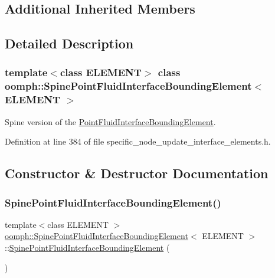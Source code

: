 \subsection*{Additional Inherited Members}


\subsection{Detailed Description}
\subsubsection*{template$<$class E\+L\+E\+M\+E\+NT$>$\newline
class oomph\+::\+Spine\+Point\+Fluid\+Interface\+Bounding\+Element$<$ E\+L\+E\+M\+E\+N\+T $>$}

Spine version of the \hyperlink{classoomph_1_1PointFluidInterfaceBoundingElement}{Point\+Fluid\+Interface\+Bounding\+Element}. 

Definition at line 384 of file specific\+\_\+node\+\_\+update\+\_\+interface\+\_\+elements.\+h.



\subsection{Constructor \& Destructor Documentation}
\mbox{\label{classoomph_1_1SpinePointFluidInterfaceBoundingElement_a4cda221f4ee0528cc89076809f54c64e}} 
\subsubsection{\texorpdfstring{Spine\+Point\+Fluid\+Interface\+Bounding\+Element()}{SpinePointFluidInterfaceBoundingElement()}}
{\footnotesize\ttfamily template$<$class E\+L\+E\+M\+E\+NT $>$ \\
\hyperlink{classoomph_1_1SpinePointFluidInterfaceBoundingElement}{oomph\+::\+Spine\+Point\+Fluid\+Interface\+Bounding\+Element}$<$ E\+L\+E\+M\+E\+NT $>$\+::\hyperlink{classoomph_1_1SpinePointFluidInterfaceBoundingElement}{Spine\+Point\+Fluid\+Interface\+Bounding\+Element} (\begin{DoxyParamCaption}{ }\end{DoxyParamCaption})\hspace{0.3cm}{\ttfamily [inline]}}



